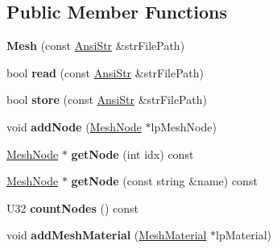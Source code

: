 \subsection*{Public Member Functions}
\begin{DoxyCompactItemize}
\item 
\hypertarget{classps_1_1scene_1_1Mesh_a7d1542f47f2eca93df5ec0d8b0464820}{}{\bfseries Mesh} (const \hyperlink{classps_1_1base_1_1CAString}{Ansi\+Str} \&str\+File\+Path)\label{classps_1_1scene_1_1Mesh_a7d1542f47f2eca93df5ec0d8b0464820}

\item 
\hypertarget{classps_1_1scene_1_1Mesh_a02a7f043091f436683eced98557b7941}{}bool {\bfseries read} (const \hyperlink{classps_1_1base_1_1CAString}{Ansi\+Str} \&str\+File\+Path)\label{classps_1_1scene_1_1Mesh_a02a7f043091f436683eced98557b7941}

\item 
\hypertarget{classps_1_1scene_1_1Mesh_a07e0c38041091f0ec048a3e97afa7f98}{}bool {\bfseries store} (const \hyperlink{classps_1_1base_1_1CAString}{Ansi\+Str} \&str\+File\+Path)\label{classps_1_1scene_1_1Mesh_a07e0c38041091f0ec048a3e97afa7f98}

\item 
\hypertarget{classps_1_1scene_1_1Mesh_a85a3e2b850980c2bf6464cd52abe9034}{}void {\bfseries add\+Node} (\hyperlink{classps_1_1scene_1_1MeshNode}{Mesh\+Node} $\ast$lp\+Mesh\+Node)\label{classps_1_1scene_1_1Mesh_a85a3e2b850980c2bf6464cd52abe9034}

\item 
\hypertarget{classps_1_1scene_1_1Mesh_a17dce90c56ead670f4bafe8734b84dbe}{}\hyperlink{classps_1_1scene_1_1MeshNode}{Mesh\+Node} $\ast$ {\bfseries get\+Node} (int idx) const \label{classps_1_1scene_1_1Mesh_a17dce90c56ead670f4bafe8734b84dbe}

\item 
\hypertarget{classps_1_1scene_1_1Mesh_ab1a9ef3f67468e41acaf72740e40f6c5}{}\hyperlink{classps_1_1scene_1_1MeshNode}{Mesh\+Node} $\ast$ {\bfseries get\+Node} (const string \&name) const \label{classps_1_1scene_1_1Mesh_ab1a9ef3f67468e41acaf72740e40f6c5}

\item 
\hypertarget{classps_1_1scene_1_1Mesh_acc814ba6fc47832d2b112ab733883f57}{}U32 {\bfseries count\+Nodes} () const \label{classps_1_1scene_1_1Mesh_acc814ba6fc47832d2b112ab733883f57}

\item 
\hypertarget{classps_1_1scene_1_1Mesh_a27f2b76dbc292767eebf2b81eb030f4e}{}void {\bfseries add\+Mesh\+Material} (\hyperlink{classps_1_1scene_1_1MeshMaterial}{Mesh\+Material} $\ast$lp\+Material)\label{classps_1_1scene_1_1Mesh_a27f2b76dbc292767eebf2b81eb030f4e}


\end{DoxyCompactItemize}
